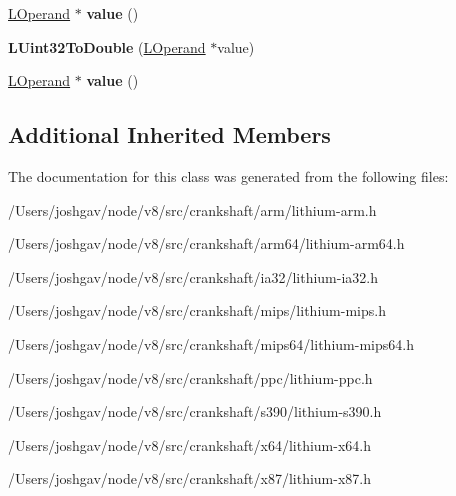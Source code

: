 \begin{DoxyCompactItemize}
\item 
\hyperlink{classv8_1_1internal_1_1_l_operand}{L\+Operand} $\ast$ {\bfseries value} ()\hypertarget{classv8_1_1internal_1_1_l_uint32_to_double_affc9209dd41148b900f25bbf91176e82}{}\label{classv8_1_1internal_1_1_l_uint32_to_double_affc9209dd41148b900f25bbf91176e82}

\item 
{\bfseries L\+Uint32\+To\+Double} (\hyperlink{classv8_1_1internal_1_1_l_operand}{L\+Operand} $\ast$value)\hypertarget{classv8_1_1internal_1_1_l_uint32_to_double_a2b6fe08f18dd913accfd83ca5e7b1d10}{}\label{classv8_1_1internal_1_1_l_uint32_to_double_a2b6fe08f18dd913accfd83ca5e7b1d10}

\item 
\hyperlink{classv8_1_1internal_1_1_l_operand}{L\+Operand} $\ast$ {\bfseries value} ()\hypertarget{classv8_1_1internal_1_1_l_uint32_to_double_affc9209dd41148b900f25bbf91176e82}{}\label{classv8_1_1internal_1_1_l_uint32_to_double_affc9209dd41148b900f25bbf91176e82}

\end{DoxyCompactItemize}
\subsection*{Additional Inherited Members}


The documentation for this class was generated from the following files\+:\begin{DoxyCompactItemize}
\item 
/\+Users/joshgav/node/v8/src/crankshaft/arm/lithium-\/arm.\+h\item 
/\+Users/joshgav/node/v8/src/crankshaft/arm64/lithium-\/arm64.\+h\item 
/\+Users/joshgav/node/v8/src/crankshaft/ia32/lithium-\/ia32.\+h\item 
/\+Users/joshgav/node/v8/src/crankshaft/mips/lithium-\/mips.\+h\item 
/\+Users/joshgav/node/v8/src/crankshaft/mips64/lithium-\/mips64.\+h\item 
/\+Users/joshgav/node/v8/src/crankshaft/ppc/lithium-\/ppc.\+h\item 
/\+Users/joshgav/node/v8/src/crankshaft/s390/lithium-\/s390.\+h\item 
/\+Users/joshgav/node/v8/src/crankshaft/x64/lithium-\/x64.\+h\item 
/\+Users/joshgav/node/v8/src/crankshaft/x87/lithium-\/x87.\+h\end{DoxyCompactItemize}
